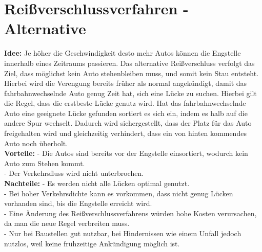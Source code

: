 \section{Reißverschlussverfahren - Alternative}
\textbf{Idee:} Je höher die Geschwindigkeit desto mehr Autos können die Engstelle innerhalb eines Zeitraums passieren. Das alternative Reißverschluss verfolgt das Ziel, dass möglichst kein Auto stehenbleiben muss, und somit kein Stau entsteht. Hierbei wird die Verengung bereits früher als normal angekündigt, damit das fahrbahnwechselnde Auto genug Zeit hat, sich eine Lücke zu suchen. Hierbei gilt die Regel, dass die erstbeste Lücke genutz wird. Hat das fahrbahnwechselnde Auto eine geeignete Lücke gefunden sortiert es sich ein, indem es halb auf die andere Spur wechselt. Dadurch wird sichergestellt, dass der Platz für das Auto freigehalten wird und gleichzeitig verhindert, dass ein von hinten kommendes Auto noch überholt. \\
\textbf{Vorteile:} - Die Autos sind bereits vor der Engstelle einsortiert, wodurch kein Auto zum Stehen kommt.\\
- Der Verkehrsfluss wird nicht unterbrochen.\\
\textbf{Nachteile:} - Es werden nicht alle Lücken optimal genutzt.\\
- Bei hoher Verkehrsdichte kann es vorkommen, dass nicht genug Lücken vorhanden sind, bis die Engstelle erreicht wird.\\
- Eine Änderung des Reißverschlussverfahrens würden hohe Kosten verursachen, da man die neue Regel verbreiten muss.\\
- Nur bei Baustellen gut nutzbar, bei Hindernissen wie einem Unfall jedoch nutzlos, weil keine frühzeitige Ankündigung möglich ist.\\